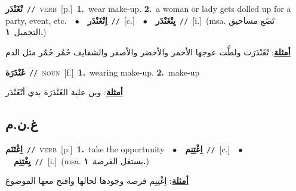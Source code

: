 \documentclass[10pt,a4paper,twoside]{article} %
\begin{document}
\begin{multicols}{2}
{\setlength\topsep{0pt}\textbf{\foreignlanguage{arabic}{تْغَنْدَر}}\ {\color{gray}\texttt{//}\color{black}}\ \textsc{verb}\ [p.]\ \textbf{1.}~wear make-up.  \textbf{2.}~a woman or lady gets dolled up for a party, event, etc.\ \ $\bullet$\ \ \setlength\topsep{0pt}\textbf{\foreignlanguage{arabic}{اِتْغَنْدَر}}\ {\color{gray}\texttt{//}\color{black}}\ [c.]\ \ $\bullet$\ \ \setlength\topsep{0pt}\textbf{\foreignlanguage{arabic}{يِتْغَنْدَر}}\ {\color{gray}\texttt{//}\color{black}}\ [i.]\ \color{gray}(msa. \foreignlanguage{arabic}{تَضَع مساحيق التجميل}~\foreignlanguage{arabic}{\textbf{١.}})\color{black}\  \begin{flushright}\color{gray}\foreignlanguage{arabic}{\textbf{\underline{\foreignlanguage{arabic}{أمثلة}}}: تْغَنْدَرَت ولطَّت عوجها الأحمر والأخضر والأصفر والشفايف حُمُر حُمُر مثل الدم}\end{flushright}\color{black}} \vspace{2mm}

{\setlength\topsep{0pt}\textbf{\foreignlanguage{arabic}{غَنْدَرَة}}\ {\color{gray}\texttt{//}\color{black}}\ \textsc{noun}\ [f.]\ \textbf{1.}~wearing make-up.  \textbf{2.}~make-up\  \begin{flushright}\color{gray}\foreignlanguage{arabic}{\textbf{\underline{\foreignlanguage{arabic}{أمثلة}}}: وين علبة الغَنْدَرَة بدي أتْغَنْدَر}\end{flushright}\color{black}} \vspace{2mm}

\vspace{-3mm}
\subsection*{\color{blue}\foreignlanguage{arabic}{غ.ن.م}\color{blue}{}} 

{\setlength\topsep{0pt}\textbf{\foreignlanguage{arabic}{اِغْتَنَم}}\ {\color{gray}\texttt{//}\color{black}}\ \textsc{verb}\ [p.]\ \textbf{1.}~take the opportunity\ \ $\bullet$\ \ \setlength\topsep{0pt}\textbf{\foreignlanguage{arabic}{اِغْتِنِم}}\ {\color{gray}\texttt{//}\color{black}}\ [c.]\ \ $\bullet$\ \ \setlength\topsep{0pt}\textbf{\foreignlanguage{arabic}{يِغْتِنِم}}\ {\color{gray}\texttt{//}\color{black}}\ [i.]\ \color{gray}(msa. \foreignlanguage{arabic}{يستغل الفرصة}~\foreignlanguage{arabic}{\textbf{١.}})\color{black}\  \begin{flushright}\color{gray}\foreignlanguage{arabic}{\textbf{\underline{\foreignlanguage{arabic}{أمثلة}}}: اِغْتِنِم فرصة وجودها لحالها وافتح معها الموضوع}\end{flushright}\color{black}} \vspace{2mm}


\end{multicols}
\end{document}
